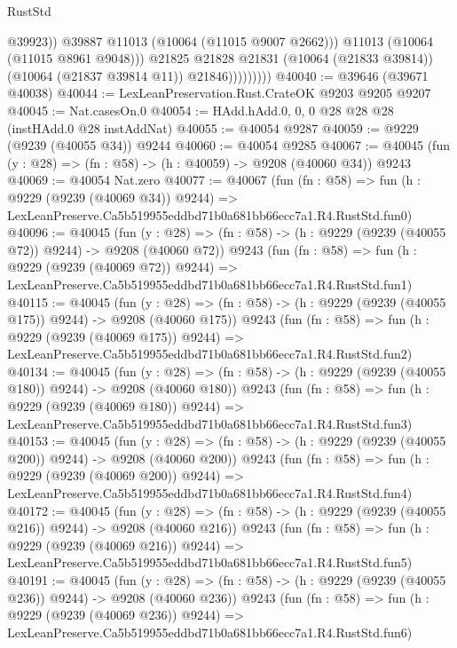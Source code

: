 \begin{lexlean}{RustStd}
\begin{coremodule}
                              @39923))
                          @39887
                          @11013
                          (@10064 (@11015 @9007 @2662)))
                        @11013
                        (@10064 (@11015 @8961 @9048)))
                      @21825
                      @21828
                      @21831
                      (@10064 (@21833 @39814))
                      (@10064 (@21837 @39814 @11))
                      @21846)))))))))
@40040 := @39646 (@39671 @40038)
@40044 := LexLeanPreservation.Rust.CrateOK @9203 @9205 @9207
@40045 := Nat.casesOn.{0}
@40054 := HAdd.hAdd.{0, 0, 0} @28 @28 @28 (instHAdd.{0} @28 instAddNat)
@40055 := @40054 @9287
@40059 := @9229 (@9239 (@40055 @34)) @9244
@40060 := @40054 @9285
@40067 := @40045 (fun (y : @28) => (fn : @58) -> (h : @40059) -> @9208 (@40060 @34)) @9243
@40069 := @40054 Nat.zero
@40077 := @40067
    (fun (fn : @58) =>
    fun (h : @9229 (@9239 (@40069 @34)) @9244) =>
    LexLeanPreserve.Ca5b519955eddbd71b0a681bb66ecc7a1.R4.RustStd.fun0)
@40096 := @40045
    (fun (y : @28) => (fn : @58) -> (h : @9229 (@9239 (@40055 @72)) @9244) -> @9208 (@40060 @72))
    @9243
    (fun (fn : @58) =>
    fun (h : @9229 (@9239 (@40069 @72)) @9244) =>
    LexLeanPreserve.Ca5b519955eddbd71b0a681bb66ecc7a1.R4.RustStd.fun1)
@40115 := @40045
    (fun (y : @28) => (fn : @58) -> (h : @9229 (@9239 (@40055 @175)) @9244) -> @9208 (@40060 @175))
    @9243
    (fun (fn : @58) =>
    fun (h : @9229 (@9239 (@40069 @175)) @9244) =>
    LexLeanPreserve.Ca5b519955eddbd71b0a681bb66ecc7a1.R4.RustStd.fun2)
@40134 := @40045
    (fun (y : @28) => (fn : @58) -> (h : @9229 (@9239 (@40055 @180)) @9244) -> @9208 (@40060 @180))
    @9243
    (fun (fn : @58) =>
    fun (h : @9229 (@9239 (@40069 @180)) @9244) =>
    LexLeanPreserve.Ca5b519955eddbd71b0a681bb66ecc7a1.R4.RustStd.fun3)
@40153 := @40045
    (fun (y : @28) => (fn : @58) -> (h : @9229 (@9239 (@40055 @200)) @9244) -> @9208 (@40060 @200))
    @9243
    (fun (fn : @58) =>
    fun (h : @9229 (@9239 (@40069 @200)) @9244) =>
    LexLeanPreserve.Ca5b519955eddbd71b0a681bb66ecc7a1.R4.RustStd.fun4)
@40172 := @40045
    (fun (y : @28) => (fn : @58) -> (h : @9229 (@9239 (@40055 @216)) @9244) -> @9208 (@40060 @216))
    @9243
    (fun (fn : @58) =>
    fun (h : @9229 (@9239 (@40069 @216)) @9244) =>
    LexLeanPreserve.Ca5b519955eddbd71b0a681bb66ecc7a1.R4.RustStd.fun5)
@40191 := @40045
    (fun (y : @28) => (fn : @58) -> (h : @9229 (@9239 (@40055 @236)) @9244) -> @9208 (@40060 @236))
    @9243
    (fun (fn : @58) =>
    fun (h : @9229 (@9239 (@40069 @236)) @9244) =>
    LexLeanPreserve.Ca5b519955eddbd71b0a681bb66ecc7a1.R4.RustStd.fun6)

\end{coremodule}
\end{lexlean}
